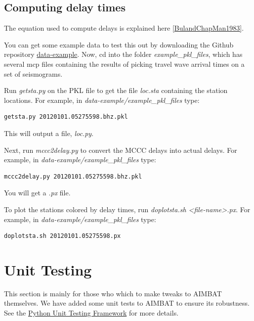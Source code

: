 \documentclass[letterpaper,10pt,english]{sphinxmanual}
\begin{document}
\section{Computing delay times}
\label{docfiles/VisualizingStations:computing-delay-times}
The equation used to compute delays is explained here {\hyperref[docfiles/citations:bulandchapman1983]{{[}BulandChapMan1983{]}}}.

You can get some example data to test this out by downloading the Github repository \href{https://github.com/pysmo/data-example}{data-example}. Now, cd into the folder \emph{example\_pkl\_files}, which has several mcp files containing the results of picking travel wave arrival times on a set of seismograms.

Run \emph{getsta.py} on the PKL file to get the file \emph{loc.sta} containing the station locations. For example, in \emph{data-example/example\_pkl\_files} type:

\begin{Verbatim}[commandchars=\\\{\}]
getsta.py 20120101.05275598.bhz.pkl
\end{Verbatim}

This will output a file, \emph{loc.py}.

Next, run \emph{mccc2delay.py} to convert the MCCC delays into actual delays. For example, in \emph{data-example/example\_pkl\_files} type:

\begin{Verbatim}[commandchars=\\\{\}]
mccc2delay.py 20120101.05275598.bhz.pkl
\end{Verbatim}

You will get a \emph{.px} file.

To plot the stations colored by delay times, run \emph{doplotsta.sh \textless{}file-name\textgreater{}.px}. For example, in \emph{data-example/example\_pkl\_files} type:

\begin{Verbatim}[commandchars=\\\{\}]
doplotsta.sh 20120101.05275598.px
\end{Verbatim}


\chapter{Unit Testing}
\label{docfiles/unitTests:unit-testing}\label{docfiles/unitTests::doc}
This section is mainly for those who which to make tweaks to AIMBAT themselves. We have added some unit tests to AIMBAT to ensure its robustness. See the \href{https://docs.python.org/2/library/unittest.html}{Python Unit Testing Framework} for more details.
\end{document}

